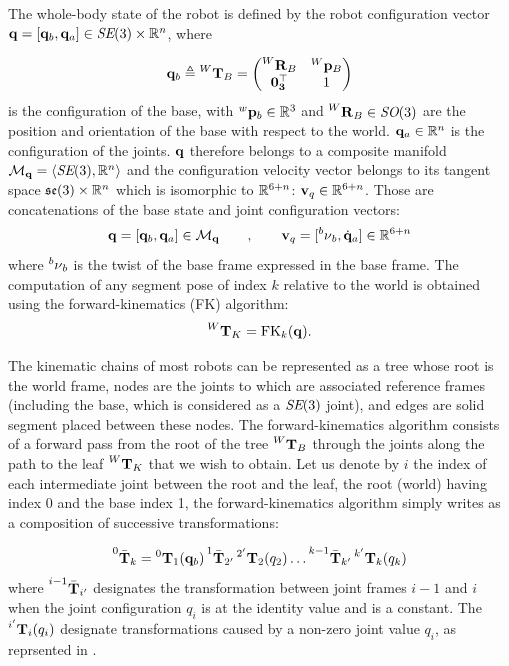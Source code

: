 The whole-body state of the robot is defined by the robot configuration vector ${\bf q}=[{\bf q}_b,{\bf q}_a]\in \textit{SE}(3) \times \mathbb{R}^n$, where 

\begin{equation}
    {\bf q}_b \triangleq \prescript{W}{}{{\bf T}}_{B} =  
    \begin{pmatrix}
        \prescript{W}{}{{\bf R}}_{B} & \prescript{W}{}{{\bf p}}_{B} \\
        \bf0_3^{\top} & 1
    \end{pmatrix}
\end{equation}
%
is the configuration of the base,
with $\prescript{w}{}{{\bf p}}_{b} \in \mathbb{R}^3$ and $\prescript{W}{}{{\bf R}}_{B} \in \textit{SO}(3)$ are the position and orientation of the base with respect to the world.
${\bf q}_a \in \mathbb{R}^n$ is the configuration of the joints. ${\bf q}$ therefore belongs to a composite manifold $\mathcal{M}_{{\bf q}} = \left<\textit{SE}(3), \mathbb{R}^n \right>$ and 
the configuration velocity vector belongs to its tangent space ${\mathfrak {se}}(3)\times \mathbb{R}^n$ which is isomorphic to $\mathbb{R}^{6+n}$: ${\bf v}_q \in \mathbb{R}^{6+n}$. Those are concatenations
of the base state and joint configuration vectors:
%
\begin{equation}
    {\bf q}= [{\bf q}_b, {\bf q}_a]\in \mathcal{M}_{{\bf q}}\quad\quad,
    \quad\quad
    {\bf v}_q= [\prescript{b}{}{\mathbf{\nu}}_b,\dot{{\bf q}}_a]  \in \mathbb{R}^{6+n}
    \label{eq:configuration}
\end{equation}
%
where $\prescript{b}{}{\mathbf{\nu}}_b$ is the twist of the base frame expressed in the base frame.
The computation of any segment pose of index $k$ relative to the world is obtained using the forward-kinematics (FK) algorithm:
%
\begin{equation}
    \prescript{W}{}{{\bf T}}_{K} = \text{FK}_k({\bf q}).
\end{equation}

The kinematic chains of most robots can be represented as a tree whose root is the world frame, nodes are the joints to which are associated reference frames 
(including the base, which is considered as a $\textit{SE}(3)$ joint), and edges are solid segment placed between these nodes.
The forward-kinematics algorithm consists of a forward pass from the root of the tree $\prescript{W}{}{{\bf T}}_{B}$ through the joints along the path to the leaf $\prescript{W}{}{{\bf T}}_{K}$ that we wish to obtain. 
Let us denote by $i$ the index of each intermediate joint between the root and the leaf, the root (world) having index 0 and the base index 1, 
the forward-kinematics algorithm simply writes as a composition of successive transformations:

\begin{equation}
    \prescript{0}{}{\bar{{\bf T}}}_{k} = \prescript{0}{}{{\bf T}}_{1}({\bf q}_b) \prescript{1}{}{\bar{{\bf T}}}_{2'}
    \prescript{2'}{}{{\bf T}}_{2}(q_2) \dots  \prescript{k-1}{}{\bar{{\bf T}}}_{k'} \prescript{k'}{}{{\bf T}}_{k}(q_k)
\end{equation}
%
where $\prescript{i-1}{}{\bar{{\bf T}}}_{i'}$ designates the transformation between joint frames $i-1$ and $i$ when the joint configuration $q_i$ is at the identity value and is a constant. 
The $\prescript{i'}{}{{\bf T}}_{i}(q_i)$ designate transformations caused by a non-zero joint value $q_i$, as reprsented in .

